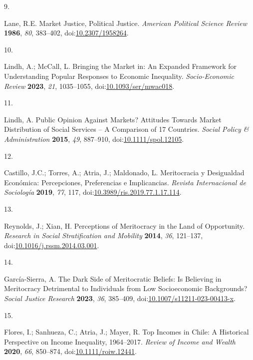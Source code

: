 \documentclass[
  12pt,
  letterpaper,
]{article}
\newlength{\cslhangindent}
\newlength{\csllabelwidth}
\newenvironment{CSLReferences}[2] %
 {\begin{list}{}{%
  \setlength{\itemindent}{0pt}
  \setlength{\leftmargin}{0pt}
  \setlength{\parsep}{0pt}
  \ifodd #1
   \setlength{\leftmargin}{\cslhangindent}
   \setlength{\itemindent}{-1\cslhangindent}
  \fi
  \setlength{\itemsep}{#2\baselineskip}}}
 {\end{list}}
\newcommand{\CSLLeftMargin}[1]{\parbox[t]{\csllabelwidth}{\strut#1\strut}}
\newcommand{\CSLRightInline}[1]{\parbox[t]{\linewidth - \csllabelwidth}{\strut#1\strut}}
\begin{document}
\begin{CSLReferences}{0}{0}
\CSLLeftMargin{9. }%
\CSLRightInline{Lane, R.E. Market {Justice}, {Political Justice}.
\emph{American Political Science Review} \textbf{1986}, \emph{80},
383--402, doi:\href{https://doi.org/10.2307/1958264}{10.2307/1958264}.}

\CSLLeftMargin{10. }%
\CSLRightInline{Lindh, A.; McCall, L. Bringing the Market in: An
Expanded Framework for Understanding Popular Responses to Economic
Inequality. \emph{Socio-Economic Review} \textbf{2023}, \emph{21},
1035--1055,
doi:\href{https://doi.org/10.1093/ser/mwac018}{10.1093/ser/mwac018}.}

\CSLLeftMargin{11. }%
\CSLRightInline{Lindh, A. Public {Opinion} Against {Markets}?
{Attitudes} Towards {Market Distribution} of {Social Services} -- {A
Comparison} of 17 {Countries}. \emph{Social Policy \& Administration}
\textbf{2015}, \emph{49}, 887--910,
doi:\href{https://doi.org/10.1111/spol.12105}{10.1111/spol.12105}.}

\CSLLeftMargin{12. }%
\CSLRightInline{Castillo, J.C.; Torres, A.; Atria, J.; Maldonado, L.
Meritocracia y Desigualdad Econ{ó}mica: {Percepciones}, Preferencias e
Implicancias. \emph{Revista Internacional de Sociolog{í}a}
\textbf{2019}, \emph{77}, 117,
doi:\href{https://doi.org/10.3989/ris.2019.77.1.17.114}{10.3989/ris.2019.77.1.17.114}.}

\CSLLeftMargin{13. }%
\CSLRightInline{Reynolds, J.; Xian, H. Perceptions of Meritocracy in the
Land of Opportunity. \emph{Research in Social Stratification and
Mobility} \textbf{2014}, \emph{36}, 121--137,
doi:\href{https://doi.org/10.1016/j.rssm.2014.03.001}{10.1016/j.rssm.2014.03.001}.}

\CSLLeftMargin{14. }%
\CSLRightInline{García-Sierra, A. The Dark Side of Meritocratic Beliefs:
{Is} Believing in Meritocracy Detrimental to Individuals from Low
Socioeconomic Backgrounds? \emph{Social Justice Research} \textbf{2023},
\emph{36}, 385--409,
doi:\href{https://doi.org/10.1007/s11211-023-00413-x}{10.1007/s11211-023-00413-x}.}

\CSLLeftMargin{15. }%
\CSLRightInline{Flores, I.; Sanhueza, C.; Atria, J.; Mayer, R. Top
{Incomes} in {Chile}: {A Historical Perspective} on {Income Inequality},
1964--2017. \emph{Review of Income and Wealth} \textbf{2020}, \emph{66},
850--874,
doi:\href{https://doi.org/10.1111/roiw.12441}{10.1111/roiw.12441}.}


\end{CSLReferences}
\end{document}
